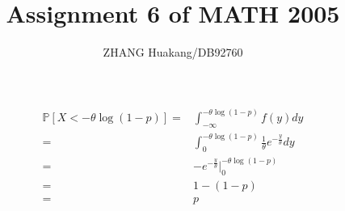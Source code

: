 \documentclass{article}
\title{Assignment 6 of MATH 2005}
\author{ZHANG Huakang/DB92760}
\begin{document}
    \maketitle
    \section{}
        \begin{equation*}
            \begin{split}
                \mathbb{P}[X< -\theta\log(1-p)]=&\int_{-\infty}^{-\theta\log(1-p)}f(y)dy\\
                    =&\int_0^{-\theta\log(1-p)}\frac{1}{\theta}e^{-\frac{y}{\theta}}dy\\
                    =&-e^{-\frac{y}{\theta}}|_{0}^{-\theta\log(1-p)}\\
                    =&1-(1-p)\\
                    =&p
            \end{split}
        \end{equation*}
\end{document}
